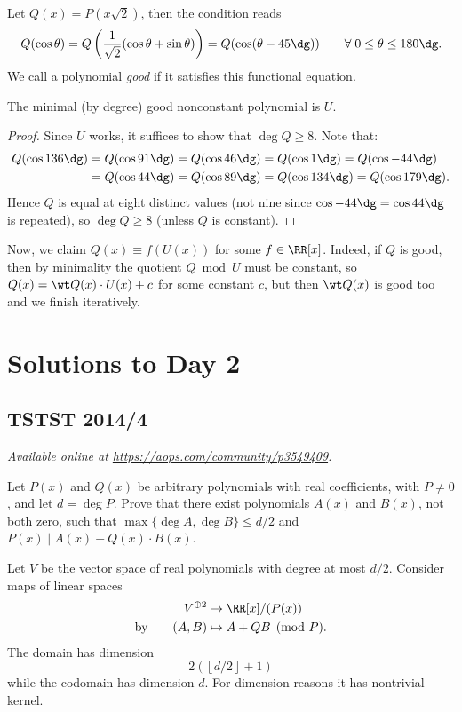 \documentclass[11pt]{scrartcl}
\begin{document}
Let $Q(x) = P(x \sqrt 2)$,
then the condition reads
\[
  Q(\cos\theta) = Q\left( \frac{1}{\sqrt2}(\cos\theta+\sin\theta) \right)
  = Q(\cos(\theta-45\dg))
  \qquad \forall \; 0 \le \theta \le 180\dg.
\]
We call a polynomial \emph{good} if it satisfies this
functional equation.
\begin{lemma*}
  The minimal (by degree) good nonconstant
  polynomial is $U$.
\end{lemma*}
\begin{proof}
  Since $U$ works, it suffices to show
  that $\deg Q \ge 8$.
  Note that:
  \begin{align*}
    Q(\cos136\dg) &= Q(\cos91\dg)
    = Q(\cos46\dg) = Q(\cos1\dg) = Q(\cos-44\dg) \\
    &= Q(\cos44\dg) = Q(\cos89\dg) = Q(\cos134\dg) = Q(\cos179\dg).
  \end{align*}
  Hence $Q$ is equal at eight distinct values
  (not nine since $\cos -44\dg = \cos44\dg$ is repeated),
  so $\deg Q \ge 8$ (unless $Q$ is constant).
\end{proof}

Now, we claim $Q(x) \equiv f(U(x))$ for some $f \in \RR[x]$.
Indeed, if $Q$ is good,
then by minimality the quotient $Q \bmod U$ must be constant,
so $Q(x) = \wt Q(x) \cdot U(x) + c$ for some constant $c$,
but then $\wt Q(x)$ is good too and we finish iteratively.
\pagebreak

\section{Solutions to Day 2}
\subsection{TSTST 2014/4}
\textsl{Available online at \url{https://aops.com/community/p3549409}.}
\begin{mdframed}[style=mdpurplebox,frametitle={Problem statement}]
Let $P(x)$ and $Q(x)$ be arbitrary polynomials with real coefficients,
with $P \neq 0$, and let $d = \deg P$.
Prove that there exist polynomials $A(x)$ and $B(x)$,
not both zero, such that $\max \{ \deg A, \deg B \} \le d/2$
and $P(x) \mid A(x) + Q(x) \cdot B(x)$.
\end{mdframed}
Let $V$ be the vector space of real polynomials with degree at most $d/2$.
Consider maps of linear spaces
\begin{align*}
  V^{\oplus 2} &\to \RR[x] / (P(x)) \\
  \text{by} \qquad (A,B) &\mapsto A+QB \pmod P.
\end{align*}
The domain has dimension
\[ 2 \left( \left\lfloor d/2 \right\rfloor + 1 \right) \]
while the codomain has dimension $d$.
For dimension reasons it has nontrivial kernel.
\pagebreak
\end{document}
